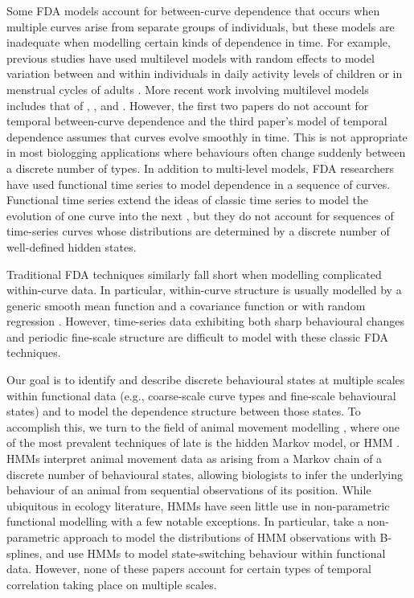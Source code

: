 Some FDA models account for between-curve dependence that occurs when multiple curves arise from separate groups of individuals, but these models are inadequate when modelling certain kinds of dependence in time. For example, previous studies have used multilevel models with random effects to model variation between and within individuals in daily activity levels of children \citep{Morris:2007} or in menstrual cycles of adults \citep{Bromback:1998}. More recent work involving multilevel models includes that of \citet{Di:2009}, \citet{Crainiceanu:2009}, and \citet{Chen:2012}. %
However, the first two papers do not account for temporal between-curve dependence and the third paper's model of temporal dependence assumes that curves evolve smoothly in time. This is not appropriate in most biologging applications where behaviours often change suddenly between a discrete number of types.
In addition to multi-level models, FDA researchers have used functional time series to model dependence in a sequence of curves. Functional time series extend the ideas of classic time series to model the evolution of one curve into the next \citep{Kokoszka:2018}, but they do not account for sequences of time-series curves whose distributions are determined by a discrete number of well-defined hidden states.

Traditional FDA techniques similarly fall short when modelling complicated within-curve data. In particular, within-curve structure is usually modelled by a generic smooth mean function and a covariance function \citep{Yao:2005} or with random regression \citep{Rice:2001}. However, time-series data exhibiting both sharp behavioural changes and periodic fine-scale structure are difficult to model with these classic FDA techniques.

Our goal is to identify and describe discrete behavioural states at multiple scales within functional data (e.g., coarse-scale curve types and fine-scale behavioural states) and to model the dependence structure between those states. To accomplish this, we turn to the field of animal movement modelling \citep{Hooten:2017}, where one of the most prevalent techniques of late is the hidden Markov model, or HMM \citep{Patterson:2017,McClintock:2020}. HMMs interpret animal movement data as arising from a Markov chain of a discrete number of behavioural states, allowing biologists to infer the underlying behaviour of an animal from sequential observations of its position. While ubiquitous in ecology literature, HMMs have seen little use in non-parametric functional modelling with a few notable exceptions. In particular, \citet{Langrock:2018} take a non-parametric approach to model the distributions of HMM observations with B-splines, and \citet{DeSouza:2014,DeSouza:2017} use HMMs to model state-switching behaviour within functional data. However, none of these papers account for certain types of temporal correlation taking place on multiple scales. 


